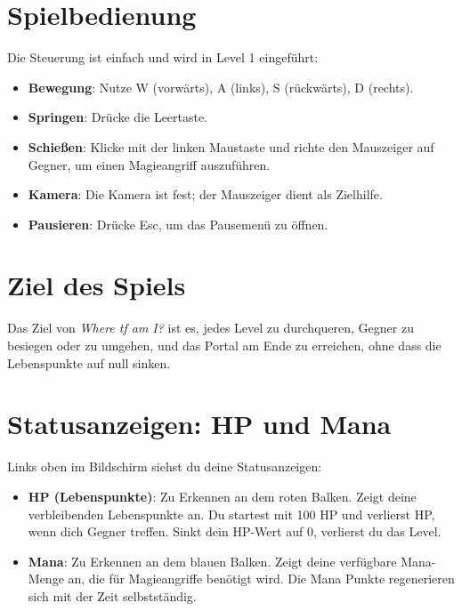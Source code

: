 \documentclass[a4paper,12pt]{article}
\begin{document}
\newpage

\section{Spielbedienung}
\label{sec:spielbedienung}

Die Steuerung ist einfach und wird in Level 1 eingeführt:

\begin{itemize}
    \item \textbf{Bewegung}: Nutze W (vorwärts), A (links), S (rückwärts), D (rechts).
    \item \textbf{Springen}: Drücke die Leertaste.
    \item \textbf{Schießen}: Klicke mit der linken Maustaste und richte den Mauszeiger auf Gegner, um einen Magieangriff auszuführen.
    \item \textbf{Kamera}: Die Kamera ist fest; der Mauszeiger dient als Zielhilfe.
    \item \textbf{Pausieren}: Drücke Esc, um das Pausemenü zu öffnen.
\end{itemize}

\newpage

\section{Ziel des Spiels}
\label{sec:ziel}

Das Ziel von \textit{Where tf am I?} ist es, jedes Level zu durchqueren, Gegner zu besiegen oder zu umgehen, und das Portal am Ende zu erreichen, ohne dass die Lebenspunkte auf null sinken.

\newpage

\section{Statusanzeigen: HP und Mana}
\label{sec:statusanzeigen}

Links oben im Bildschirm siehst du deine Statusanzeigen:
\begin{itemize}
    \item \textbf{HP (Lebenspunkte)}: Zu Erkennen an dem roten Balken. Zeigt deine verbleibenden Lebenspunkte an. Du startest mit 100 HP und verlierst HP, wenn dich Gegner treffen. Sinkt dein HP-Wert auf 0, verlierst du das Level.
    \item \textbf{Mana}: Zu Erkennen an dem blauen Balken. Zeigt deine verfügbare Mana-Menge an, die für Magieangriffe benötigt wird. Die Mana Punkte regenerieren sich mit der Zeit selbstständig.
\end{itemize}
\end{document}

